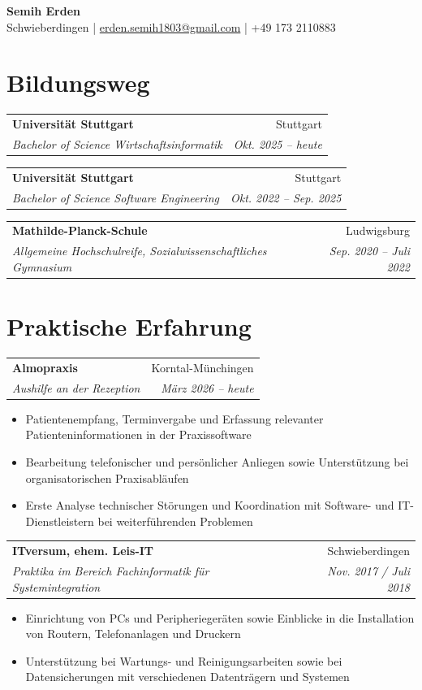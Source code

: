 \documentclass[10pt,a4paper]{article}
\makeatletter
\newcommand{\cventry}[4]{%
\noindent
\begin{tabularx}{\textwidth}{@{}X r@{}}
  \textbf{#1} & #3 \\
  \textit{#2} & \textit{#4}
\end{tabularx}
}
\makeatother
\begin{document}
\begin{center}
  {\LARGE\bfseries Semih Erden}\\[0.3em]
  Schwieberdingen
  \enspace|\enspace
  \href{mailto:erden.semih1803@gmail.com}{erden.semih1803@gmail.com}
  \enspace|\enspace
  +49 173 2110883
\end{center}

\vspace{-0.1em}

\section{Bildungsweg}

\cventry
  {Universität Stuttgart}
  {Bachelor of Science Wirtschaftsinformatik}
  {Stuttgart}
  {Okt. 2025 -- heute}

\cventry
  {Universität Stuttgart}
  {Bachelor of Science Software Engineering}
  {Stuttgart}
  {Okt. 2022 -- Sep. 2025}

\cventry
  {Mathilde-Planck-Schule}
  {Allgemeine Hochschulreife, Sozialwissenschaftliches Gymnasium}
  {Ludwigsburg}
  {Sep. 2020 -- Juli 2022}

\section{Praktische Erfahrung}

\cventry
  {Almopraxis}
  {Aushilfe an der Rezeption}
  {Korntal-Münchingen}
  {März 2026 -- heute}

\begin{itemize}
  \item Patientenempfang, Terminvergabe und Erfassung relevanter Patienteninformationen in der Praxissoftware
  \item Bearbeitung telefonischer und persönlicher Anliegen sowie Unterstützung bei organisatorischen Praxisabläufen
  \item Erste Analyse technischer Störungen und Koordination mit Software- und IT-Dienstleistern bei weiterführenden Problemen
\end{itemize}

\cventry
  {ITversum, ehem. Leis-IT}
  {Praktika im Bereich Fachinformatik für Systemintegration}
  {Schwieberdingen}
  {Nov. 2017 / Juli 2018}

\begin{itemize}
  \item Einrichtung von PCs und Peripheriegeräten sowie Einblicke in die Installation von Routern, Telefonanlagen und Druckern
  \item Unterstützung bei Wartungs- und Reinigungsarbeiten sowie bei Datensicherungen mit verschiedenen Datenträgern und Systemen
\end{itemize}
\end{document}
